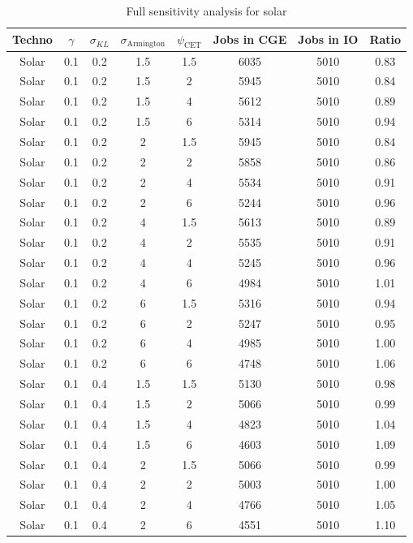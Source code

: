 \begin{table}
	\small
	\centering
	\caption{Full sensitivity analysis for solar }
	\begin{tabular}{cccccccc}
		\toprule
		Techno & $\gamma$ & $\sigma_{KL}$ & $\sigma_{\text{Armington}}$ & $\psi_{\text{CET}}$ & Jobs in CGE &Jobs in IO & Ratio \\
		\midrule
		Solar & 0.1 & 0.2 & 1.5 & 1.5 & 6035 & 5010 & 0.83 \\
		Solar & 0.1 & 0.2 & 1.5 & 2 & 5945 & 5010 & 0.84 \\
		Solar & 0.1 & 0.2 & 1.5 & 4 & 5612 & 5010 & 0.89 \\
		Solar & 0.1 & 0.2 & 1.5 & 6 & 5314 & 5010 & 0.94 \\
		Solar & 0.1 & 0.2 & 2 & 1.5 & 5945 & 5010 & 0.84 \\
		Solar & 0.1 & 0.2 & 2 & 2 & 5858 & 5010 & 0.86 \\
		Solar & 0.1 & 0.2 & 2 & 4 & 5534 & 5010 & 0.91 \\
		Solar & 0.1 & 0.2 & 2 & 6 & 5244 & 5010 & 0.96 \\
		Solar & 0.1 & 0.2 & 4 & 1.5 & 5613 & 5010 & 0.89 \\
		Solar & 0.1 & 0.2 & 4 & 2 & 5535 & 5010 & 0.91 \\
		Solar & 0.1 & 0.2 & 4 & 4 & 5245 & 5010 & 0.96 \\
		Solar & 0.1 & 0.2 & 4 & 6 & 4984 & 5010 & 1.01 \\
		Solar & 0.1 & 0.2 & 6 & 1.5 & 5316 & 5010 & 0.94 \\
		Solar & 0.1 & 0.2 & 6 & 2 & 5247 & 5010 & 0.95 \\
		Solar & 0.1 & 0.2 & 6 & 4 & 4985 & 5010 & 1.00 \\
		Solar & 0.1 & 0.2 & 6 & 6 & 4748 & 5010 & 1.06 \\
		Solar & 0.1 & 0.4 & 1.5 & 1.5 & 5130 & 5010 & 0.98 \\
		Solar & 0.1 & 0.4 & 1.5 & 2 & 5066 & 5010 & 0.99 \\
		Solar & 0.1 & 0.4 & 1.5 & 4 & 4823 & 5010 & 1.04 \\
		Solar & 0.1 & 0.4 & 1.5 & 6 & 4603 & 5010 & 1.09 \\
		Solar & 0.1 & 0.4 & 2 & 1.5 & 5066 & 5010 & 0.99 \\
		Solar & 0.1 & 0.4 & 2 & 2 & 5003 & 5010 & 1.00 \\
		Solar & 0.1 & 0.4 & 2 & 4 & 4766 & 5010 & 1.05 \\
		Solar & 0.1 & 0.4 & 2 & 6 & 4551 & 5010 & 1.10 \\

\end{tabular}
\end{table}
